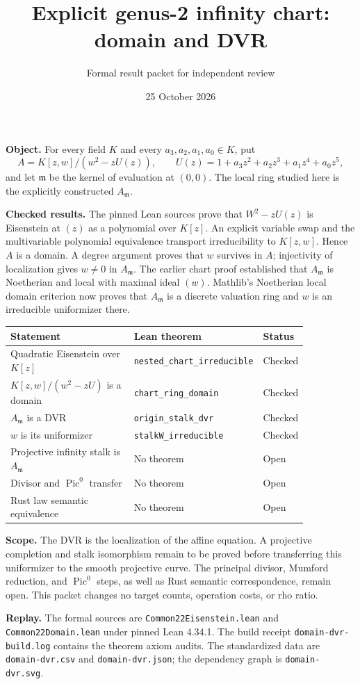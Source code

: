 \documentclass[11pt]{article}
\title{Explicit genus-2 infinity chart: domain and DVR}
\author{Formal result packet for independent review}
\date{25 October 2026}
\begin{document}
\maketitle
\noindent\textbf{Object.} For every field $K$ and every $a_3,a_2,a_1,a_0\in K$, put
\[
A=K[z,w]/(w^2-zU(z)),\qquad
U(z)=1+a_3z^2+a_2z^3+a_1z^4+a_0z^5,
\]
and let $\mathfrak m$ be the kernel of evaluation at $(0,0)$. The local ring studied here is the explicitly constructed $A_{\mathfrak m}$.

\medskip\noindent\textbf{Checked results.} The pinned Lean sources prove that $W^2-zU(z)$ is Eisenstein at $(z)$ as a polynomial over $K[z]$. An explicit variable swap and the multivariable polynomial equivalence transport irreducibility to $K[z,w]$. Hence $A$ is a domain. A degree argument proves that $w$ survives in $A$; injectivity of localization gives $w\neq0$ in $A_{\mathfrak m}$. The earlier chart proof established that $A_{\mathfrak m}$ is Noetherian and local with maximal ideal $(w)$. Mathlib's Noetherian local domain criterion now proves that $A_{\mathfrak m}$ is a discrete valuation ring and $w$ is an irreducible uniformizer there.

\begin{center}
\begin{tabular}{p{0.48\linewidth}p{0.37\linewidth}l}\toprule
Statement & Lean theorem & Status\\\midrule
Quadratic Eisenstein over $K[z]$ & \texttt{nested\_chart\_irreducible} & Checked\\
$K[z,w]/(w^2-zU)$ is a domain & \texttt{chart\_ring\_domain} & Checked\\
$A_{\mathfrak m}$ is a DVR & \texttt{origin\_stalk\_dvr} & Checked\\
$w$ is its uniformizer & \texttt{stalkW\_irreducible} & Checked\\
Projective infinity stalk is $A_{\mathfrak m}$ & No theorem & Open\\
Divisor and $\operatorname{Pic}^0$ transfer & No theorem & Open\\
Rust law semantic equivalence & No theorem & Open\\\bottomrule
\end{tabular}
\end{center}

\noindent\textbf{Scope.} The DVR is the localization of the affine equation. A projective completion and stalk isomorphism remain to be proved before transferring this uniformizer to the smooth projective curve. The principal divisor, Mumford reduction, and $\operatorname{Pic}^0$ steps, as well as Rust semantic correspondence, remain open. This packet changes no target counts, operation costs, or rho ratio.

\medskip\noindent\textbf{Replay.} The formal sources are \texttt{Common22Eisenstein.lean} and \texttt{Common22Domain.lean} under pinned Lean 4.34.1. The build receipt \texttt{domain-dvr-build.log} contains the theorem axiom audits. The standardized data are \texttt{domain-dvr.csv} and \texttt{domain-dvr.json}; the dependency graph is \texttt{domain-dvr.svg}.
\end{document}
